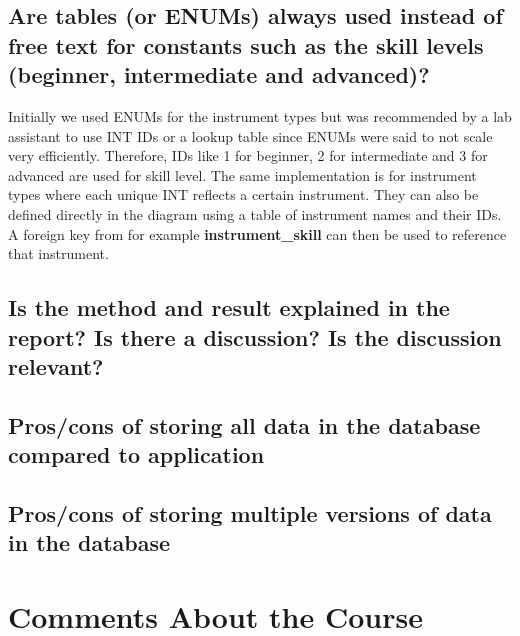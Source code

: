 \documentclass[a4paper]{scrartcl}
\begin{document}
\subsection{Are tables (or ENUMs) always used instead of free text for constants such as the skill levels (beginner, intermediate and advanced)?}
Initially we used ENUMs for the instrument types but was recommended by a lab assistant to use INT IDs or a lookup table since ENUMs were said to not scale very efficiently. Therefore, IDs like 1 for beginner, 2 for intermediate and 3 for advanced are used for skill level. The same implementation is for instrument types where each unique INT reflects a certain instrument. They can also be defined directly in the diagram using a table of instrument names and their IDs. A foreign key from for example \textbf{instrument\_skill} can then be used to reference that instrument.


\subsection{Is the method and result explained in the report? Is there a discussion? Is the discussion relevant?}


\subsection{Pros/cons of storing all data in the database compared to application}


\subsection{Pros/cons of storing multiple versions of data in the database}

\section{Comments About the Course}
\end{document}
